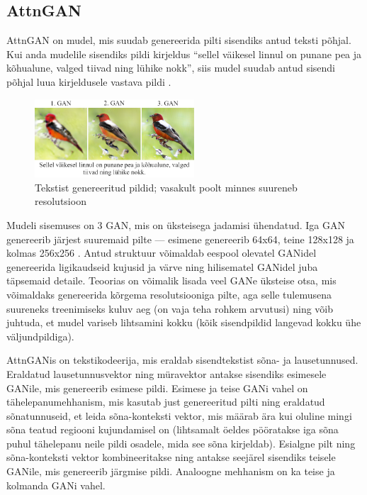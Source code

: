 \documentclass{vilgym}
\begin{document}
	\subsection{AttnGAN}

	AttnGAN on mudel, mis suudab genereerida pilti sisendiks antud teksti põhjal. Kui anda mudelile sisendiks pildi kirjeldus \enquote{sellel väikesel linnul on punane pea ja kõhualune, valged tiivad ning lühike nokk}, siis mudel suudab antud sisendi põhjal luua kirjeldusele vastava pildi .
	
	\begin{figure}
		\includegraphics[width=0.53\textwidth]{images/attngan.png}
		\caption{Tekstist genereeritud pildid; vasakult poolt minnes suureneb resolutsioon}
		\label{fig:attngan}
	\end{figure}

	Mudeli sisemuses on 3 GAN, mis on üksteisega jadamisi ühendatud. Iga GAN genereerib järjest suuremaid pilte --- esimene genereerib 64x64, teine 128x128 ja kolmas 256x256 . Antud struktuur võimaldab eespool olevatel GANidel genereerida ligikaudseid kujusid ja värve ning hilisematel GANidel juba täpsemaid detaile. Teoorias on võimalik lisada veel GANe üksteise otsa, mis võimaldaks genereerida kõrgema resolutsiooniga pilte, aga selle tulemusena suureneks treenimiseks kuluv aeg (on vaja teha rohkem arvutusi) ning võib juhtuda, et mudel variseb lihtsamini kokku (kõik sisendpildid langevad kokku ühe väljundpildiga).

	AttnGANis on tekstikodeerija, mis eraldab sisendtekstist sõna- ja lausetunnused. Eraldatud lausetunnusvektor ning müravektor antakse sisendiks esimesele GANile, mis genereerib esimese pildi. Esimese ja teise GANi vahel on tähelepanumehhanism, mis kasutab just genereeritud pilti ning eraldatud sõnatunnuseid, et leida sõna-konteksti vektor, mis määrab ära kui oluline mingi sõna teatud regiooni kujundamisel on (lihtsamalt öeldes pööratakse iga sõna puhul tähelepanu neile pildi osadele, mida see sõna kirjeldab). Esialgne pilt ning sõna-konteksti vektor kombineeritakse ning antakse seejärel sisendiks teisele GANile, mis genereerib järgmise pildi. Analoogne mehhanism on ka teise ja kolmanda GANi vahel.
\end{document}
